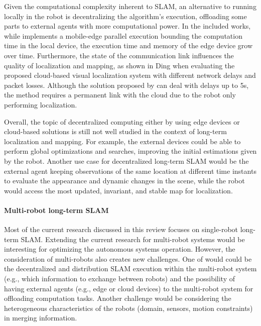 Given the computational complexity inherent to SLAM, an alternative to running locally in the robot is decentralizing the algorithm's execution, offloading some parts to external agents with more computational power.
In the included works, while \cite{ali-et-al:2020:3389033} implements a mobile-edge parallel execution bounding the computation time in the local device, the execution time and memory of the edge device grow over time. Furthermore, the state of the communication link influences the quality of localization and mapping, as shown in Ding when evaluating the proposed cloud-based visual localization system with different network delays and packet losses.
Although the solution proposed by \cite{ding-et-al:2019:8968550} can deal with delays up to 5s, the method requires a permanent link with the cloud due to the robot only performing localization.

Overall, the topic of decentralized computing either by using edge devices or cloud-based solutions is still not well studied in the context of long-term localization and mapping. For example, the external devices could be able to perform global optimizations and searches, improving the initial estimations given by the robot. Another use case for decentralized long-term SLAM would be the external agent keeping observations of the same location at different time instants to evaluate the appearance and dynamic changes in the scene, while the robot would access the most updated, invariant, and stable map for localization.



\paragraph{Multi-robot long-term SLAM}

Most of the current research discussed in this review focuses on single-robot long-term SLAM. Extending the current research for multi-robot systems would be interesting for optimizing the autonomous systems operation. However, the consideration of multi-robots also creates new challenges. One of would could be the decentralized and distribution SLAM execution within the multi-robot system (e.g., which information to exchange between robots) and the possibility of having external agents (e.g., edge or cloud devices) to the multi-robot system for offloading computation tasks. Another challenge would be considering the heterogeneous characteristics of the robots (domain, sensors, motion constraints) in merging information.



